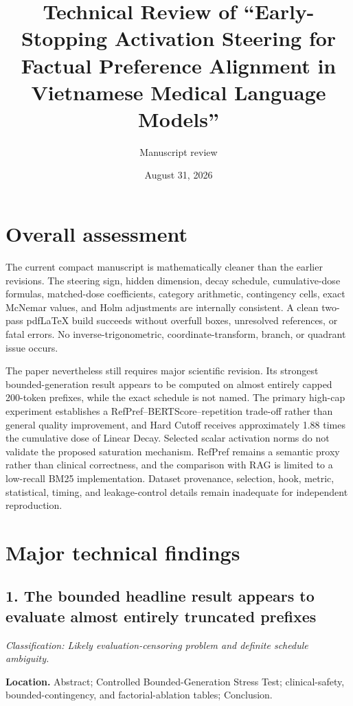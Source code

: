 \documentclass[11pt]{article}
\title{Technical Review of ``Early-Stopping Activation Steering for Factual Preference Alignment in Vietnamese Medical Language Models''}
\author{Manuscript review}
\date{August 31, 2026}
\newcommand{\findinglabel}[1]{\textbf{#1}}
\newcommand{\classification}[1]{\textit{Classification: #1.}}
\begin{document}
\maketitle

\section*{Overall assessment}

The current compact manuscript is mathematically cleaner than the earlier revisions.  The steering sign, hidden dimension, decay schedule, cumulative-dose formulas, matched-dose coefficients, category arithmetic, contingency cells, exact McNemar values, and Holm adjustments are internally consistent.  A clean two-pass pdfLaTeX build succeeds without overfull boxes, unresolved references, or fatal errors.  No inverse-trigonometric, coordinate-transform, branch, or quadrant issue occurs.

The paper nevertheless still requires major scientific revision.  Its strongest bounded-generation result appears to be computed on almost entirely capped 200-token prefixes, while the exact schedule is not named.  The primary high-cap experiment establishes a RefPref--BERTScore--repetition trade-off rather than general quality improvement, and Hard Cutoff receives approximately 1.88 times the cumulative dose of Linear Decay.  Selected scalar activation norms do not validate the proposed saturation mechanism.  RefPref remains a semantic proxy rather than clinical correctness, and the comparison with RAG is limited to a low-recall BM25 implementation.  Dataset provenance, selection, hook, metric, statistical, timing, and leakage-control details remain inadequate for independent reproduction.

\section*{Major technical findings}

\subsection*{1. The bounded headline result appears to evaluate almost entirely truncated prefixes}

\classification{Likely evaluation-censoring problem and definite schedule ambiguity}

\findinglabel{Location.} Abstract; Controlled Bounded-Generation Stress Test; clinical-safety, bounded-contingency, and factorial-ablation tables; Conclusion.
\end{document}
